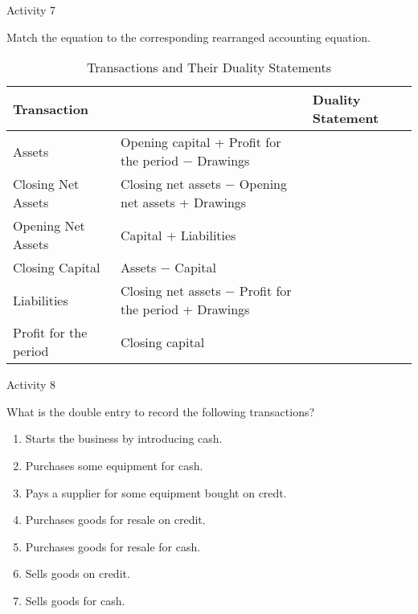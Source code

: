 \newpage

Activity 7

Match the equation to the corresponding rearranged accounting equation. 

\begin{table}[h!]
\centering
\begin{tabular}{|l|p{8cm}|l|}
\hline
\textbf{Transaction} & & \textbf{Duality Statement} \\
\hline
Assets & Opening capital + Profit for the period − Drawings & \\
\hline
Closing Net Assets & Closing net assets − Opening net assets + Drawings & \\
\hline
Opening Net Assets & Capital + Liabilities & \\
\hline
Closing Capital & Assets − Capital & \\
\hline
Liabilities & Closing net assets − Profit for the period + Drawings & \\
\hline
Profit for the period & Closing capital & \\
\hline
\end{tabular}
\caption{Transactions and Their Duality Statements}
\end{table}


Activity 8

What is the double entry to record the following transactions? 

\begin{enumerate}
    \item Starts the business by introducing cash.
    \item Purchases some equipment for cash. 
    \item Pays a supplier for some equipment bought on credt. 
    \item Purchases goods for resale on credit. 
    \item Purchases goods for resale for cash. 
    \item Sells goods on credit. 
    \item Sells goods for cash.
\end{enumerate}
